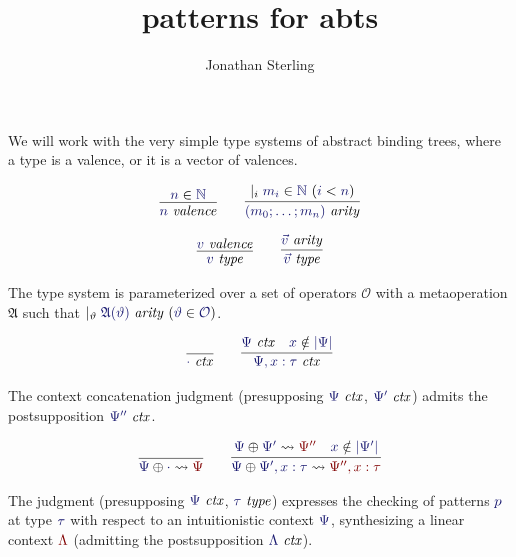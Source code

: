 \documentclass[11pt]{amsart}
\theoremstyle{definition}
\theoremstyle{remark}
\numberwithin{equation}{section}
\def\InputModeColorName{MidnightBlue}
\def\OutputModeColorName{Maroon}
\newcommand\InputMode[1]{{\color{\InputModeColorName}{#1}}}
\newcommand\OutputMode[1]{{\color{\OutputModeColorName}{#1}}}
\newcommand\HypJ[2]{#1\ (#2)}
\newcommand\GenJ[2]{\vert_{#1}\; #2}
\newcommand\Member[2]{\InputMode{#1}\in \InputMode{#2}}
\newcommand\NotMember[2]{\InputMode{#1}\notin \InputMode{#2}}
\newcommand\Nat{\mathbb{N}}
\newcommand\IsType[1]{\InputMode{#1}\ \mathit{type}}
\newcommand\IsValence[1]{\InputMode{#1}\ \mathit{valence}}
\newcommand\IsArity[1]{\InputMode{#1}\ \mathit{arity}}
\newcommand\IsCtx[1]{\InputMode{#1}\ \mathit{ctx}}
\newcommand\CtxAppend[3]{\InputMode{#1}\oplus\InputMode{#2}\leadsto\OutputMode{#3}}
\newcommand\Dom[1]{|#1|}
\newcommand\OPS{\mathcal{O}}
\newcommand\Arity{\mathfrak{A}}
\newcommand\ChkPat[4]{\InputMode{#1}\mid\OutputMode{#4}\Vdash\InputMode{#2}:\InputMode{#3}}
\newcommand\jframe[1]{\framebox{\ensuremath{#1}}}
\begin{document}
\title{patterns for abts}

\author{Jonathan Sterling}
\address{}

\onehalfspacing

\maketitle

We will work with the very simple type systems of abstract binding trees, where
a type is a valence, or it is a vector of valences.

\begin{gather*}
  \infer{
    \IsValence{n}
  }{
    \Member{n}{\Nat}
  }
  \qquad
  \infer{
    \IsArity{(m_0;\dots;m_n)}
  }{
    \GenJ{i}{\HypJ{\Member{m_i}{\Nat}}{\InputMode{i} < \InputMode{n}}}
  }\\[6pt]
  \infer{
    \IsType{v}
  }{
    \IsValence{v}
  }
  \qquad
  \infer{
    \IsType{\vec{v}}
  }{
    \IsArity{\vec{v}}
  }
\end{gather*}

The type system is parameterized over a set of operators $\OPS$ with a
metaoperation $\Arity$ such that $\GenJ{\vartheta}{\HypJ{\IsArity{\Arity(\vartheta)}}{\Member{\vartheta}{\OPS}}}$.

\begin{gather*}
  \infer{
    \IsCtx{\cdot}
  }{
  }
  \qquad
  \infer{
    \IsCtx{\Psi, x:\tau}
  }{
    \IsCtx{\Psi} &
    \NotMember{x}{\Dom\Psi}
  }
\end{gather*}

The context concatenation judgment \jframe{\CtxAppend{\Psi}{\Psi'}{\Psi''}}
(presupposing $\IsCtx{\Psi}$, $\IsCtx{\Psi'}$) admits the postsupposition
$\IsCtx{\Psi''}$.

\begin{gather*}
  \infer{
    \CtxAppend{\Psi}{\cdot}{\Psi}
  }{
  }
  \qquad
  \infer{
    \CtxAppend{\Psi}{\Psi',x:\tau}{\Psi'',x:\tau}
  }{
    \CtxAppend{\Psi}{\Psi'}{\Psi''} &
    \NotMember{x}{\Dom{\Psi'}}
  }
\end{gather*}

The judgment \jframe{\ChkPat{\Psi}{p}{\tau}{\Lambda}} (presupposing
$\IsCtx{\Psi}$, $\IsType{\tau}$) expresses the checking of patterns
$\InputMode{p}$ at type $\InputMode{\tau}$ with respect to an intuitionistic
context $\InputMode{\Psi}$, synthesizing a linear context
$\OutputMode{\Lambda}$ (admitting the postsupposition $\IsCtx{\Lambda}$).
\end{document}
